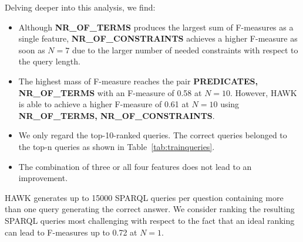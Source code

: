 

Delving deeper into this analysis, we find:
\begin{itemize}
\item Although \textbf{NR\_OF\_TERMS} produces the largest sum of F-measures as a single feature, \textbf{NR\_OF\_CONSTRAINTS} achieves a higher F-measure as soon as $N=7$ due to the larger number of needed constraints with respect to the query length.
\item The highest mass of F-measure reaches the pair \textbf{PREDICATES, NR\_OF\_TERMS} with an F-measure of 0.58 at $N=10$. However, HAWK is able to achieve a higher F-measure of 0.61 at $N=10$ using \textbf{NR\_OF\_TERMS, NR\_OF\_CONSTRAINTS}.
\item We only regard the top-10-ranked queries. The correct queries belonged to the top-n queries as shown in Table~\ref{tab:trainqueries}.
\item The combination of three or all four features does not lead to an improvement. %
\end{itemize}

HAWK generates up to 15000 SPARQL queries per question containing more than one query generating the correct answer. 
We consider ranking the resulting SPARQL queries most challenging with respect to the fact that an ideal ranking can lead to F-measures up to 0.72 at $N=1$.

